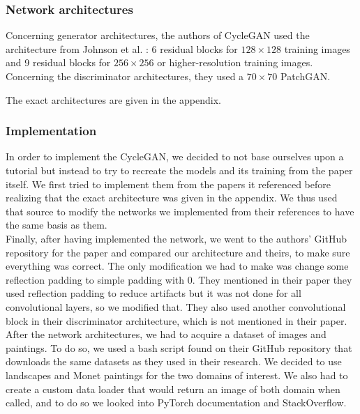 \documentclass[twocolumn,superscriptaddress,aps,floatfix, nofootinbib]{revtex4-1}
\begin{document}
    \subsubsection{Network architectures}\label{sec:methods.cyclegan.architecture}
    
    Concerning generator architectures, the authors of CycleGAN used the architecture from Johnson et al. \cite{DBLP:journals/corr/JohnsonAL16} : 6 residual blocks for $128 \times 128$ training images and 9 residual blocks for $256 \times 256$ or higher-resolution training images.\\
    
    Concerning the discriminator architectures, they used a $70 \times 70$ PatchGAN.
    
    The exact architectures are given in the appendix.
    
    \subsubsection{Implementation}
    
    In order to implement the CycleGAN, we decided to not base ourselves upon a tutorial but instead to try to recreate the models and its training from the paper \cite{DBLP:journals/corr/ZhuPIE17} itself. We first tried to implement them from the papers it referenced before realizing that the exact architecture was given in the appendix. We thus used that source to modify the networks we implemented from their references to have the same basis as them.\\
    
    Finally, after having implemented the network, we went to the authors' GitHub repository\cite{cycgit} for the paper and compared our architecture and theirs, to make sure everything was correct. The only modification we had to make was change some reflection padding to simple padding with 0. They mentioned in their paper they used reflection padding to reduce artifacts but it was not done for all convolutional layers, so we modified that. They also used another convolutional block in their discriminator architecture, which is not mentioned in their paper.\\
    
    After the network architectures, we had to acquire a dataset of images and paintings. To do so, we used a bash script found on their GitHub repository that downloads the same datasets as they used in their research. We decided to use landscapes and Monet paintings for the two domains of interest. We also had to create a custom data loader that would return an image of both domain when called, and to do so we looked into PyTorch documentation and StackOverflow.\\
    
\end{document}
